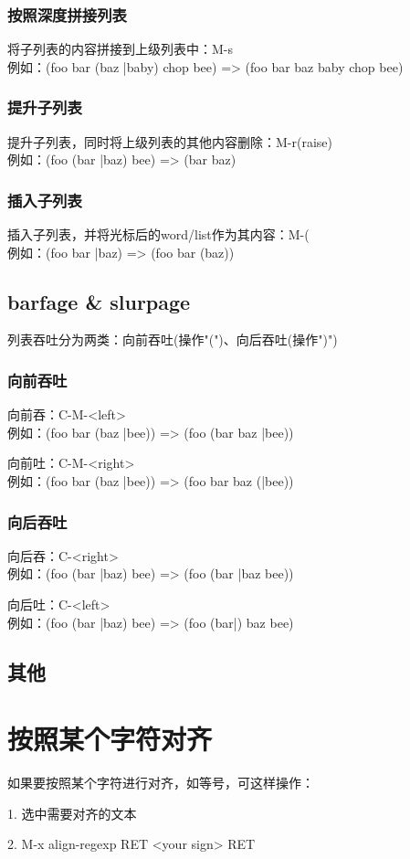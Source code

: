 \documentclass[a4paper,11pt]{article}
\begin{document}
  \subsubsection[按照深度拼接列表]{按照深度拼接列表}
  将子列表的内容拼接到上级列表中：M-s\\
  例如：(foo bar (baz |baby) chop bee) => (foo bar baz baby chop bee)

  \subsubsection[提升子列表]{提升子列表}
  提升子列表，同时将上级列表的其他内容删除：M-r(raise)\\
  例如：(foo (bar |baz) bee) => (bar baz)

  \subsubsection[插入子列表]{插入子列表}
  插入子列表，并将光标后的word/list作为其内容：M-(\\
  例如：(foo bar |baz) => (foo bar (baz))

  \subsection[barfage \& slurpage]{barfage \& slurpage}
  列表吞吐分为两类：向前吞吐(操作"(")、向后吞吐(操作")")\\
  \subsubsection[向前吞吐]{向前吞吐}
  向前吞：C-M-<left>\\
  例如：(foo bar (baz |bee)) => (foo (bar baz |bee))
  
  向前吐：C-M-<right>\\
  例如：(foo bar (baz |bee)) => (foo bar baz (|bee))
  \subsubsection[向后吞吐]{向后吞吐}
  向后吞：C-<right>\\
  例如：(foo (bar |baz) bee) => (foo (bar |baz bee))

  向后吐：C-<left>\\
  例如：(foo (bar |baz) bee) => (foo (bar|) baz bee)
  
  \subsection[其他]{其他}


  \section[按照某个字符对齐]{按照某个字符对齐}
  如果要按照某个字符进行对齐，如等号，可这样操作：

  1. 选中需要对齐的文本

  2. M-x align-regexp RET <your sign> RET


  
  
\end{document}
